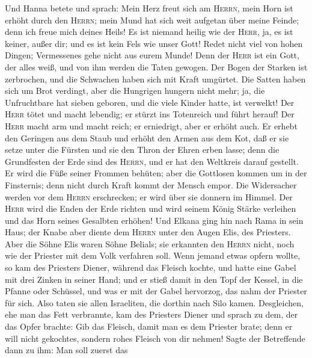  Und Hanna betete und sprach: Mein Herz freut sich am
\textsc{Herrn}, mein Horn ist erhöht durch den \textsc{Herrn}; mein Mund
hat sich weit aufgetan über meine Feinde; denn ich freue mich deines
Heils!  Es ist niemand heilig wie der \textsc{Herr}, ja,
es ist keiner, außer dir; und es ist kein Fels wie unser Gott!
 Redet nicht viel von hohen Dingen; Vermessenes gehe nicht
aus eurem Munde! Denn der \textsc{Herr} ist ein Gott, der alles weiß,
und von ihm werden die Taten gewogen.  Der Bogen der
Starken ist zerbrochen, und die Schwachen haben sich mit Kraft umgürtet.
 Die Satten haben sich um Brot verdingt, aber die
Hungrigen hungern nicht mehr; ja, die Unfruchtbare hat sieben geboren,
und die viele Kinder hatte, ist verwelkt!  Der
\textsc{Herr} tötet und macht lebendig; er stürzt ins Totenreich und
führt herauf!  Der \textsc{Herr} macht arm und macht
reich; er erniedrigt, aber er erhöht auch.  Er erhebt den
Geringen aus dem Staub und erhöht den Armen aus dem Kot, daß er sie
setze unter die Fürsten und sie den Thron der Ehren erben lasse; denn
die Grundfesten der Erde sind des \textsc{Herrn}, und er hat den
Weltkreis darauf gestellt.  Er wird die Füße seiner
Frommen behüten; aber die Gottlosen kommen um in der Finsternis; denn
nicht durch Kraft kommt der Mensch empor.  Die
Widersacher werden vor dem \textsc{Herrn} erschrecken; er wird über sie
donnern im Himmel. Der \textsc{Herr} wird die Enden der Erde richten und
wird seinem König Stärke verleihen und das Horn seines Gesalbten
erhöhen!  Und Elkana ging hin nach Rama in sein Haus; der
Knabe aber diente dem \textsc{Herrn} unter den Augen Elis, des
Priesters.  Aber die Söhne Elis waren Söhne Belials; sie
erkannten den \textsc{Herrn} nicht, noch wie der Priester mit dem Volk
verfahren soll.  Wenn jemand etwas opfern wollte, so kam
des Priesters Diener, während das Fleisch kochte, und hatte eine Gabel
mit drei Zinken in seiner Hand;  und er stieß damit in
den Topf der Kessel, in die Pfanne oder Schüssel, und was er mit der
Gabel hervorzog, das nahm der Priester für sich. Also taten sie allen
Israeliten, die dorthin nach Silo kamen.  Desgleichen,
ehe man das Fett verbrannte, kam des Priesters Diener und sprach zu dem,
der das Opfer brachte: Gib das Fleisch, damit man es dem Priester brate;
denn er will nicht gekochtes, sondern rohes Fleisch von dir nehmen!
 Sagte der Betreffende dann zu ihm: Man soll zuerst das
